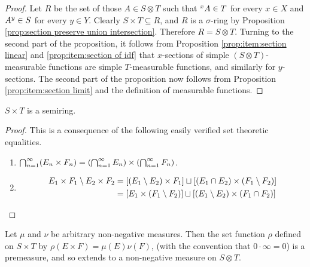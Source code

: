 \begin{proof}
Let $R$ be the set of those $A\in S\otimes T$ such that $\xsec{A}{x}\in T$ for every $x\in X$ and $\ysec{A}{y}\in S$ for every $y\in Y$. Clearly $S\times T\subseteq R$, and $R$ is a $\sigma$-ring by Proposition \ref{prop:section preserve union intersection}. Therefore $R=S\otimes T$. Turning to the second part of the proposition, it follows from Proposition \ref{prop:item:section linear} and \ref{prop:item:section of idf} that $x$-sections of simple $(S\otimes T)$-measurable functions are simple $T$-measurable functions, and similarly for $y$-sections. The second part of the proposition now follows from Proposition \ref{prop:item:section limit} and the definition of measurable functions.
\end{proof}

\begin{lemma}
$S\times T$ is a semiring.
\end{lemma}

\begin{proof}
This is a consequence of the following easily verified set theoretic equalities.
\begin{enumerate}
    \item $\bigcap_{n=1}^\infty(E_n\times F_n)=\br{\bigcap_{n=1}^\infty E_n}\times\br{\bigcap_{n=1}^\infty F_n}$.
    
    \item
    \begin{align*}
        E_1\times F_1\sd E_2\times F_2&=\sbr{(E_1\sd E_2)\times F_1}\du[(E_1\cap E_2)\times(F_1\sd F_2)]\\
        &=[E_1\times(F_1\sd F_2)]\du[(E_1\sd E_2)\times(F_1\cap F_2)]
    \end{align*}
\end{enumerate}
\end{proof}

\begin{theorem}
\label{thm:product premeasure is premeasure}
Let $\mu$ and $\nu$ be arbitrary non-negative measures. Then the set function $\rho$ defined on $S\times T$ by $\rho(E\times F)=\mu(E)\nu(F)$, (with the convention that $0\cdot\infty=0$) is a premeasure, and so extends to a non-negative measure on $S\otimes T$.
\end{theorem}

